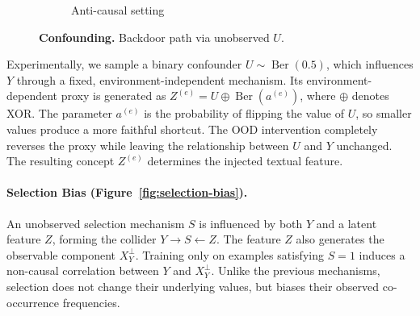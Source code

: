 \documentclass[11pt]{article}
\theoremstyle{definition}
\theoremstyle{plain}
\begin{document}
\begin{figure}[!htbp]
\begin{subfigure}[t]{0.48\linewidth}
{
        }
        \caption{Anti-causal setting}
        \label{fig:anti_confounding}
    \end{subfigure}
    \caption{\textbf{Confounding.} Backdoor path via unobserved $U$.}
    \label{fig:confounding}
\end{figure}

Experimentally, we sample a binary confounder $U\sim\operatorname{Ber}(0.5)$, which influences $Y$ through a fixed, environment-independent mechanism. Its environment-dependent proxy is generated as $Z^{(e)} = U \oplus \operatorname{Ber}\!\left(a^{(e)}\right)$, where $\oplus$ denotes XOR. The parameter $a^{(e)}$ is the probability of flipping the value of $U$, so smaller values produce a more faithful shortcut. The OOD intervention completely reverses the proxy while leaving the relationship between $U$ and $Y$ unchanged. The resulting concept $Z^{(e)}$ determines the injected textual feature.

\paragraph{Selection Bias (Figure~\ref{fig:selection-bias}).} An unobserved selection mechanism $S$ is influenced by both $Y$ and a latent feature $Z$, forming the collider $Y \rightarrow S \leftarrow Z$. The feature $Z$ also generates the observable component $X_Y^{\perp}$. Training only on examples satisfying $S=1$ induces a non-causal correlation between $Y$ and $X_Y^{\perp}$. Unlike the previous mechanisms, selection does not change their underlying values, but biases their observed co-occurrence frequencies.
\end{document}
